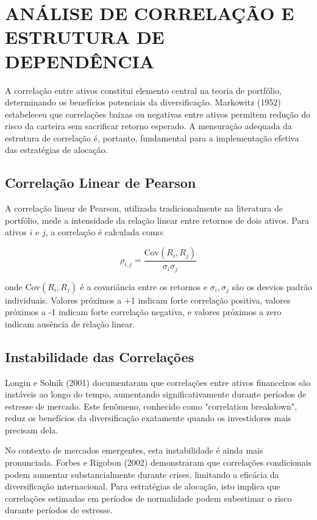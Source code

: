 \section{ANÁLISE DE CORRELAÇÃO E ESTRUTURA DE DEPENDÊNCIA}

A correlação entre ativos constitui elemento central na teoria de portfólio, determinando os benefícios potenciais da diversificação. Markowitz (1952) estabeleceu que correlações baixas ou negativas entre ativos permitem redução do risco da carteira sem sacrificar retorno esperado. A mensuração adequada da estrutura de correlação é, portanto, fundamental para a implementação efetiva das estratégias de alocação.

\subsection{Correlação Linear de Pearson}

A correlação linear de Pearson, utilizada tradicionalmente na literatura de portfólio, mede a intensidade da relação linear entre retornos de dois ativos. Para ativos $i$ e $j$, a correlação é calculada como:

\begin{equation}
\rho_{i,j} = \frac{\text{Cov}(R_i, R_j)}{\sigma_i \sigma_j}
\end{equation}

onde $\text{Cov}(R_i, R_j)$ é a covariância entre os retornos e $\sigma_i, \sigma_j$ são os desvios padrão individuais. Valores próximos a +1 indicam forte correlação positiva, valores próximos a -1 indicam forte correlação negativa, e valores próximos a zero indicam ausência de relação linear.

\subsection{Instabilidade das Correlações}

Longin e Solnik (2001) documentaram que correlações entre ativos financeiros são instáveis ao longo do tempo, aumentando significativamente durante períodos de estresse de mercado. Este fenômeno, conhecido como "correlation breakdown", reduz os benefícios da diversificação exatamente quando os investidores mais precisam dela.

No contexto de mercados emergentes, esta instabilidade é ainda mais pronunciada. Forbes e Rigobon (2002) demonstraram que correlações condicionais podem aumentar substancialmente durante crises, limitando a eficácia da diversificação internacional. Para estratégias de alocação, isto implica que correlações estimadas em períodos de normalidade podem subestimar o risco durante períodos de estresse.

